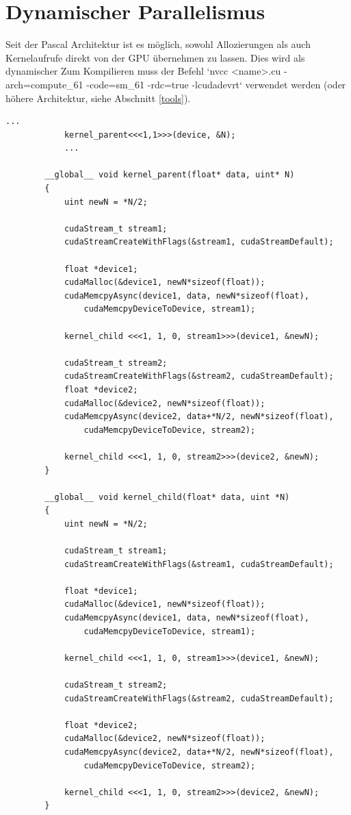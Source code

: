 		\section{Dynamischer Parallelismus}\label{dyn}
		Seit der Pascal Architektur ist es möglich, sowohl Allozierungen als auch \Gls{Kernel}aufrufe direkt von der GPU übernehmen zu lassen. Dies wird als dynamischer Zum Kompilieren muss der Befehl \li`nvcc <name>.cu -arch=compute_61 -code=sm_61 -rdc=true -lcudadevrt` verwendet werden (oder höhere Architektur, siehe Abschnitt \ref{tools}).
		\begin{lstlisting}[caption=Dynamischer Parallelismus]
			...
  			kernel_parent<<<1,1>>>(device, &N);
			...
			
		__global__ void kernel_parent(float* data, uint* N)
		{
  			uint newN = *N/2;
  
			cudaStream_t stream1; 
			cudaStreamCreateWithFlags(&stream1, cudaStreamDefault);
  
			float *device1;
			cudaMalloc(&device1, newN*sizeof(float));
			cudaMemcpyAsync(device1, data, newN*sizeof(float), 
				cudaMemcpyDeviceToDevice, stream1);
  
			kernel_child <<<1, 1, 0, stream1>>>(device1, &newN);
  
			cudaStream_t stream2; 
			cudaStreamCreateWithFlags(&stream2, cudaStreamDefault);
			float *device2;
			cudaMalloc(&device2, newN*sizeof(float));
			cudaMemcpyAsync(device2, data+*N/2, newN*sizeof(float), 
				cudaMemcpyDeviceToDevice, stream2);
  
			kernel_child <<<1, 1, 0, stream2>>>(device2, &newN);
		}

		__global__ void kernel_child(float* data, uint *N)
		{
			uint newN = *N/2;
  
			cudaStream_t stream1; 
			cudaStreamCreateWithFlags(&stream1, cudaStreamDefault);
			
			float *device1;
			cudaMalloc(&device1, newN*sizeof(float));
			cudaMemcpyAsync(device1, data, newN*sizeof(float), 
				cudaMemcpyDeviceToDevice, stream1);
  
			kernel_child <<<1, 1, 0, stream1>>>(device1, &newN);
  
			cudaStream_t stream2; 
			cudaStreamCreateWithFlags(&stream2, cudaStreamDefault);
			
			float *device2;
			cudaMalloc(&device2, newN*sizeof(float));
			cudaMemcpyAsync(device2, data+*N/2, newN*sizeof(float), 
				cudaMemcpyDeviceToDevice, stream2);
  
			kernel_child <<<1, 1, 0, stream2>>>(device2, &newN);
		}
		\end{lstlisting}
		
